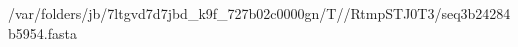 \documentclass[10pt]{article}
\begin{document}
\begin{texshade}{/var/folders/jb/7ltgvd7d7jbd_k9f_727b02c0000gn/T//RtmpSTJ0T3/seq3b24284b5954.fasta}
\hidelogoscale
{}
\showlegend
\end{texshade}
\end{document}
